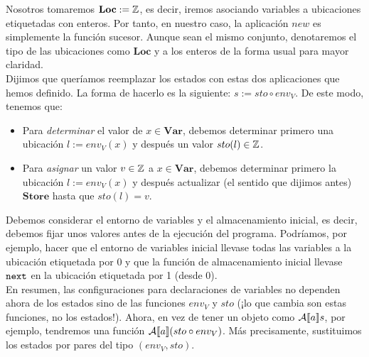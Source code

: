 Nosotros tomaremos $\mathbf{Loc} := \mathbb{Z}$, es decir, iremos asociando variables a ubicaciones etiquetadas con enteros. Por tanto, en nuestro caso, la aplicación $new$ es simplemente la función sucesor. Aunque sean el mismo conjunto, denotaremos el tipo de las ubicaciones como $\mathbf{Loc}$ y a los enteros de la forma usual para mayor claridad.
\\


Dijimos que queríamos reemplazar los estados con estas dos aplicaciones que hemos definido. La forma de hacerlo es la siguiente: $s := sto \circ env_V$. De este modo, tenemos que:
\begin{itemize}
    \item Para \textit{determinar} el valor de $x \in \mathbf{Var}$, debemos determinar primero una ubicación $l := env_V(x)$ y después un valor $sto(l) \in \mathbb{Z}$.
    \item Para \textit{asignar} un valor $v \in \mathbb{Z}$ a $x \in \mathbf{Var}$, debemos determinar primero la ubicación $l := env_V(x)$ y después actualizar (el sentido que dijimos antes) $\mathbf{Store}$ hasta que $sto(l) = v$.
\end{itemize}
Debemos considerar el entorno de variables y el almacenamiento inicial, es decir, debemos fijar unos valores antes de la ejecución del programa. Podríamos, por ejemplo, hacer que el entorno de variables inicial llevase todas las variables a la ubicación etiquetada por 0 y que la función de almacenamiento inicial llevase $\texttt{next}$ en la ubicación etiquetada por 1 (desde 0).
\\

En resumen, las configuraciones para declaraciones de variables no dependen ahora de los estados sino de las funciones $env_V$ y $sto$ (¡lo que cambia son estas funciones, no los estados!). Ahora, en vez de tener un objeto como $\mathcal{A}[\![a]\!]s$, por ejemplo, tendremos una función $\mathcal{A}[\![a]\!](sto \circ env_V)$. Más precisamente, sustituimos los estados por pares del tipo $(env_V, sto)$.
\\

